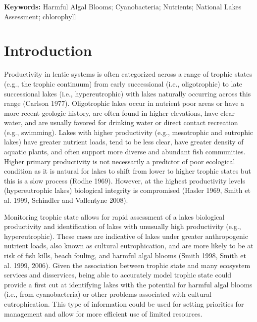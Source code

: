 \documentclass[12pt,]{article}
\begin{document}
\doublespace

\textbf{Keywords:} Harmful Algal Blooms; Cyanobacteria; Nutrients;
National Lakes Assessment; chlorophyll

\section{Introduction}\label{introduction}

Productivity in lentic systems is often categorized across a range of
trophic states (e.g., the trophic continuum) from early successional
(i.e., oligotrophic) to late successional lakes (i.e., hypereutrophic)
with lakes naturally occurring across this range (Carlson 1977).
Oligotrophic lakes occur in nutrient poor areas or have a more recent
geologic history, are often found in higher elevations, have clear
water, and are usually favored for drinking water or direct contact
recreation (e.g., swimming). Lakes with higher productivity (e.g.,
mesotrophic and eutrophic lakes) have greater nutrient loads, tend to be
less clear, have greater density of aquatic plants, and often support
more diverse and abundant fish communities. Higher primary productivity
is not necessarily a predictor of poor ecological condition as it is
natural for lakes to shift from lower to higher trophic states but this
is a slow process (Rodhe 1969). However, at the highest productivity
levels (hypereutrophic lakes) biological integrity is compromised
(Hasler 1969, Smith et al. 1999, Schindler and Vallentyne 2008).

Monitoring trophic state allows for rapid assessment of a lakes
biological productivity and identification of lakes with unusually high
productivity (e.g., hypereutrophic). These cases are indicative of lakes
under greater anthropogenic nutrient loads, also known as cultural
eutrophication, and are more likely to be at risk of fish kills, beach
fouling, and harmful algal blooms (Smith 1998, Smith et al. 1999, 2006).
Given the association between trophic state and many ecosystem services
and disservices, being able to accurately model trophic state could
provide a first cut at identifying lakes with the potential for harmful
algal blooms (i.e., from cyanobacteria) or other problems associated
with cultural eutrophication. This type of information could be used for
setting priorities for management and allow for more efficient use of
limited resources.
\end{document}
